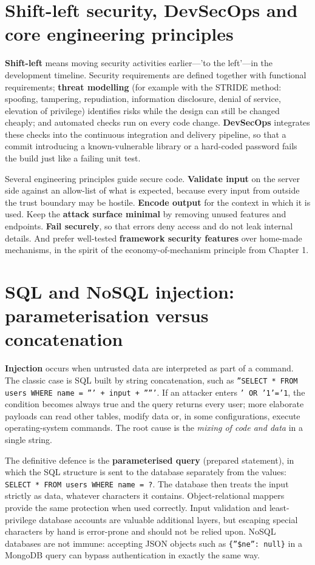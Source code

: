 \section{Shift-left security, DevSecOps and core engineering principles}\label{sec:9.1}
\textbf{Shift-left} means moving security activities earlier—'to the left'—in the development timeline. Security requirements are defined together with functional requirements; \textbf{threat modelling} (for example with the STRIDE method: spoofing, tampering, repudiation, information disclosure, denial of service, elevation of privilege) identifies risks while the design can still be changed cheaply; and automated checks run on every code change. \textbf{DevSecOps} integrates these checks into the continuous integration and delivery pipeline, so that a commit introducing a known-vulnerable library or a hard-coded password fails the build just like a failing unit test.

Several engineering principles guide secure code. \textbf{Validate input} on the server side against an allow-list of what is expected, because every input from outside the trust boundary may be hostile. \textbf{Encode output} for the context in which it is used. Keep the \textbf{attack surface minimal} by removing unused features and endpoints. \textbf{Fail securely}, so that errors deny access and do not leak internal details. And prefer well-tested \textbf{framework security features} over home-made mechanisms, in the spirit of the economy-of-mechanism principle from Chapter 1.

\section{SQL and NoSQL injection: parameterisation versus concatenation}\label{sec:9.2}
\textbf{Injection} occurs when untrusted data are interpreted as part of a command. The classic case is SQL built by string concatenation, such as \texttt{''SELECT * FROM users WHERE name = ''' + input + '''''}. If an attacker enters \texttt{' OR '1'='1}, the condition becomes always true and the query returns every user; more elaborate payloads can read other tables, modify data or, in some configurations, execute operating-system commands. The root cause is the \emph{mixing of code and data} in a single string.

The definitive defence is the \textbf{parameterised query} (prepared statement), in which the SQL structure is sent to the database separately from the values: \texttt{SELECT * FROM users WHERE name = ?}. The database then treats the input strictly as data, whatever characters it contains. Object-relational mappers provide the same protection when used correctly. Input validation and least-privilege database accounts are valuable additional layers, but escaping special characters by hand is error-prone and should not be relied upon. NoSQL databases are not immune: accepting JSON objects such as \texttt{\{''\$ne'': null\}} in a MongoDB query can bypass authentication in exactly the same way.

